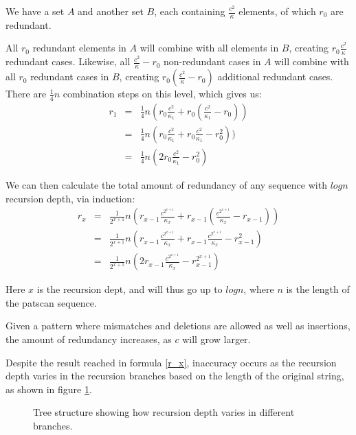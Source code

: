 \documentclass[12pt]{article}
\theoremstyle{definition}
\begin{document}
\begin{example}
We have a set $A$ and another set $B$, each containing $\frac{c^2}{\kappa}$ elements, of which $r_0$ are redundant.

All $r_0$ redundant elements in $A$ will combine with all elements in $B$, creating $r_0\frac{c^2}{\kappa}$ redundant cases. Likewise, all $\frac{c^2}{\kappa}-r_0$ non-redundant cases in $A$ will combine with all $r_0$ redundant cases in $B$, creating $r_0(\frac{c^2}{\kappa}-r_0)$ additional redundant cases. There are $\frac{1}{4}n$ combination steps on this level, which gives us:
\begin{eqnarray}
	r_1 &=& \frac{1}{4}n(r_0\frac{c^2}{\kappa_1} + r_0(\frac{c^2}{\kappa_1} - r_0))\\
		&=& \frac{1}{4}n(r_0\frac{c^2}{\kappa_1} + r_0\frac{c^2}{\kappa_1} - r_0^2))\\
		&=& \frac{1}{4}n(2r_0\frac{c^2}{\kappa_1} - r_0^2)
\end{eqnarray}
\end{example}

We can then calculate the total amount of redundancy of any sequence with $logn$ recursion depth, via induction:
\begin{eqnarray}
	r_x &=& \frac{1}{2^{x+1}}n (r_{x-1}\frac{c^{2^{x+1}}}{\kappa_x} + r_{x-1}(\frac{c^{2^{x+1}}}{\kappa_x} - r_{x-1}))\\
		&=& \frac{1}{2^{x+1}}n (r_{x-1}\frac{c^{2^{x+1}}}{\kappa_x} + r_{x-1}\frac{c^{2^{x+1}}}{\kappa_x} - r_{x-1}^2)\\
		\label{r_x}
		&=& \frac{1}{2^{x+1}}n (2r_{x-1}\frac{c^{2^{x+1}}}{\kappa_x} - r_{x-1}^{2^{x+1}})
\end{eqnarray}

Here $x$ is the recursion dept, and will thus go up to $logn$, where $n$ is the length of the patscan sequence.

Given a pattern where mismatches and deletions are allowed as well as insertions, the amount of redundancy increases, as $c$ will grow larger.

Despite the result reached in formula \ref{r_x}, inaccuracy occurs as the recursion depth varies in the recursion branches based on the length of the original string, as shown in figure \ref{fig:recursion_depth_example}.

\begin{figure}[H]
	\centering
	\caption{Tree structure showing how recursion depth varies in different branches.}
	\label{fig:recursion_depth_example}
\end{figure}
\end{document}
